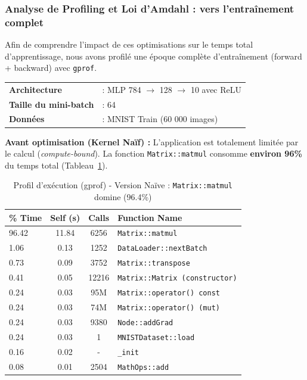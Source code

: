 \documentclass[a4paper,11pt]{article}
\begin{document}
\subsubsection{Analyse de Profiling et Loi d'Amdahl : vers l'entraînement complet}

Afin de comprendre l'impact de ces optimisations sur le temps total d'apprentissage, nous avons profilé une époque complète d'entraînement (forward + backward) avec \texttt{gprof}.

\begin{tabular}{@{}ll@{}}
\textbf{Architecture} & : MLP 784 $\to$ 128 $\to$ 10 avec ReLU \\
\textbf{Taille du mini-batch} & : 64 \\
\textbf{Données}      & : MNIST Train (60 000 images)
\end{tabular}

\textbf{Avant optimisation (Kernel Naïf) :}
L'application est totalement limitée par le calcul (\emph{compute-bound}). La fonction \texttt{Matrix::matmul} consomme \textbf{environ 96\%} du temps total (Tableau~\ref{tab:gprof_naive}).

\begin{table}[H]
    \centering
    \caption{Profil d'exécution (gprof) - Version Naïve : \texttt{Matrix::matmul} domine (96.4\%)}
    \label{tab:gprof_naive}
    \begin{tabular}{lccl}
        \toprule
        \textbf{\% Time} & \textbf{Self (s)} & \textbf{Calls} & \textbf{Function Name} \\
        \midrule
        96.42 & 11.84 & 6256 & \texttt{Matrix::matmul} \\
        1.06 & 0.13 & 1252 & \texttt{DataLoader::nextBatch} \\
        0.73 & 0.09 & 3752 & \texttt{Matrix::transpose} \\
        0.41 & 0.05 & 12216 & \texttt{Matrix::Matrix (constructor)} \\
        0.24 & 0.03 & 95M & \texttt{Matrix::operator() const} \\
        0.24 & 0.03 & 74M & \texttt{Matrix::operator() (mut)} \\
        0.24 & 0.03 & 9380 & \texttt{Node::addGrad} \\
        0.24 & 0.03 & 1 & \texttt{MNISTDataset::load} \\
        0.16 & 0.02 & - & \texttt{\_init} \\
        0.08 & 0.01 & 2504 & \texttt{MathOps::add} \\
        \bottomrule
    \end{tabular}
\end{table}
\end{document}
